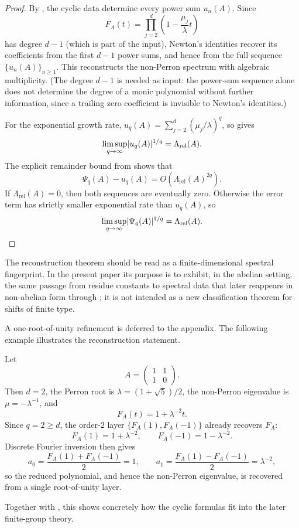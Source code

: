 \begin{proof}
  By , the cyclic
  data determine every power sum \(u_n(A)\). Since
  \[
    F_A(t)=\prod_{j=2}^d\left(1-\frac{\mu_j}{\lambda}t\right)
  \]
  has degree \(d-1\) (which is part of the input), Newton's identities
  recover its coefficients from the first \(d-1\) power sums, and hence
  from the full sequence \(\{u_n(A)\}_{n\ge 1}\). This reconstructs the
  non-Perron spectrum with algebraic multiplicity. (The degree \(d-1\)
  is needed as input: the power-sum sequence alone does not determine
  the degree of a monic polynomial without further information, since a
  trailing zero coefficient is invisible to Newton's identities.)

  For the exponential growth rate,
  \(u_q(A)=\sum_{j=2}^d(\mu_j/\lambda)^q\), so
   gives
  \[
    \limsup_{q\to\infty}\lvert u_q(A) \rvert^{1/q}
    =\Lambda_{\mathrm{rel}}(A).
  \]
  The explicit remainder bound from
   shows that
  \[
    \Psi_q(A)-u_q(A)
    =O\!\left(\Lambda_{\mathrm{rel}}(A)^{2q}\right).
  \]
  If \(\Lambda_{\mathrm{rel}}(A)=0\), then both sequences are
  eventually zero. Otherwise the error term has strictly smaller
  exponential rate than \(u_q(A)\), so
  \[
    \limsup_{q\to\infty}\lvert \Psi_q(A) \rvert^{1/q}
    =\Lambda_{\mathrm{rel}}(A).
  \]
\end{proof}

The reconstruction theorem should be read as a finite-dimensional
spectral fingerprint. In the present paper its purpose is to exhibit, in
the abelian setting, the same passage from residue constants to spectral
data that later reappears in non-abelian form through
; it is not intended as a new
classification theorem for shifts of finite type.

A one-root-of-unity refinement is deferred to the appendix. The
following example illustrates the reconstruction statement.

\begin{remark}
  \label{rem:finite-part-fibonacci-example}
  Let
  \[
    A=\begin{pmatrix}
      1 & 1 \\
      1 & 0
    \end{pmatrix}.
  \]
  Then \(d=2\), the Perron root is
  \(\lambda=(1+\sqrt5)/2\), the non-Perron eigenvalue is
  \(\mu=-\lambda^{-1}\), and
  \[
    F_A(t)=1+\lambda^{-2}t.
  \]
  Since \(q=2\ge d\), the order-\(2\) layer
  \(\{F_A(1),F_A(-1)\}\) already recovers \(F_A\):
  \[
    F_A(1)=1+\lambda^{-2},
    \qquad
    F_A(-1)=1-\lambda^{-2}.
  \]
  Discrete Fourier inversion then gives
  \[
    a_0=\frac{F_A(1)+F_A(-1)}{2}=1,
    \qquad
    a_1=\frac{F_A(1)-F_A(-1)}{2}=\lambda^{-2},
  \]
  so the reduced polynomial, and hence the non-Perron eigenvalue, is
  recovered from a single root-of-unity layer.
\end{remark}

Together with ,
this shows concretely how the cyclic formulas fit into the later
finite-group theory.
